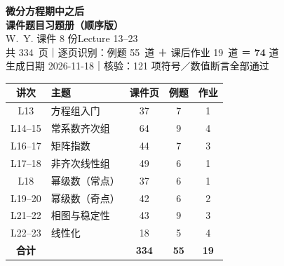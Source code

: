 \documentclass[10.5pt]{ctexart}
\begin{document}
\thispagestyle{empty}

\begin{center}
\vspace*{1.0cm}
{\color{deepblue}\Huge\bfseries 微分方程\quad 期中之后}\\[8pt]
{\color{deepblue}\Large\bfseries 课件题目习题册\quad（顺序版）}\\[16pt]
{\large W.~Y. 课件 8 份\quad Lecture 13--23}\\[4pt]
{\small 共 334\ 页\quad｜\quad 逐页识别：例题 55\ 道 ＋ 课后作业 19\ 道 ＝ \textbf{74} 道}\\[2pt]
{\small 生成日期 2026-11-18\quad｜\quad 核验：121 项符号／数值断言全部通过}
\end{center}

\vspace{0.5cm}
\begin{center}
\renewcommand{\arraystretch}{1.25}
\small
\begin{tabular}{|c|>{\raggedright\arraybackslash}p{6.4cm}|c|c|c|}
\hline
\textbf{讲次} & \textbf{主题} & \textbf{课件页} & \textbf{例题} & \textbf{作业}\\\hline
L13 & 方程组入门 & 37 & 7 & 1\\\hline
L14--15 & 常系数齐次组 & 64 & 9 & 4\\\hline
L16--17 & 矩阵指数 & 44 & 7 & 3\\\hline
L17--18 & 非齐次线性组 & 49 & 6 & 1\\\hline
L18 & 幂级数（常点） & 37 & 6 & 1\\\hline
L19--20 & 幂级数（奇点） & 42 & 6 & 2\\\hline
L21--22 & 相图与稳定性 & 43 & 9 & 3\\\hline
L22--23 & 线性化 & 18 & 5 & 4\\\hline
\hline
\textbf{合计} & & \textbf{334} & \textbf{55} & \textbf{19}\\\hline
\end{tabular}
\end{center}
\end{document}
